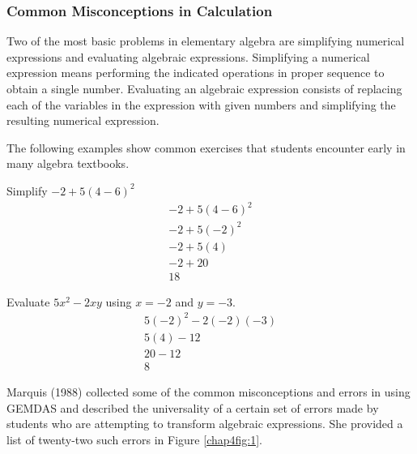 \subsubsection*{Common Misconceptions in Calculation}
Two of the most basic problems in elementary algebra are simplifying numerical expressions
and evaluating algebraic expressions. Simplifying a numerical expression means performing the
indicated operations in proper sequence to obtain a single number. Evaluating an algebraic
expression consists of replacing each of the variables in the expression with given numbers and
simplifying the resulting numerical expression.

The following examples show common exercises that students encounter early in many
algebra textbooks.

\begin{example}
\item Simplify $-2+5(4-6)^2$
\begin{equation*}
\boxed{
\begin{split}
-2+5(4-6)^2\\
			-2+5(-2)^2\\
			-2+5(4)\\
			-2+20\\
			18
\end{split}
}
\end{equation*}
\item Evaluate $5x^2-2xy$ using $x=-2$ and $y=-3$.
\begin{equation*}
\boxed{
\begin{split}
5(-2)^2-2(-2)(-3)\\
5(4)-12\\
20-12\\
8
\end{split}
}
\end{equation*}
\end{example}
Marquis (1988) collected some of the common misconceptions and errors in using GEMDAS
and described the universality of a certain set of errors made by students who are attempting to
transform algebraic expressions. She provided a list of twenty-two such errors in Figure \eqref{chap4fig:1}.
